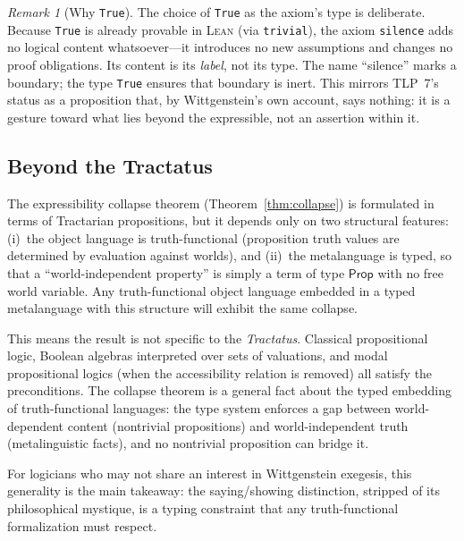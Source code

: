 \documentclass[jsl,bibother]{asl}
\theoremstyle{definition}
\theoremstyle{remark}
\newtheorem{remark}[theorem]{Remark}
\newcommand{\Prop}{\mathsf{Prop}}
\newcommand{\Lean}{\textsc{Lean}}
\begin{document}
\begin{remark}[Why \texttt{True}]
\label{rem:why-true}
The choice of \texttt{True} as the axiom's type is deliberate.
Because \texttt{True} is already provable in \Lean{} (via
\texttt{trivial}), the axiom \texttt{silence} adds no logical
content whatsoever---it introduces no new assumptions and
changes no proof obligations.  Its content is its \emph{label},
not its type.  The name ``silence'' marks a boundary; the
type \texttt{True} ensures that boundary is inert.  This
mirrors TLP~7's status as a proposition that, by Wittgenstein's
own account, says nothing: it is a gesture toward what lies
beyond the expressible, not an assertion within it.
\end{remark}

\subsection{Beyond the Tractatus}
\label{sec:beyond}

The expressibility collapse theorem
(Theorem~\ref{thm:collapse}) is formulated in terms of
Tractarian propositions, but it depends only on two structural
features: (i)~the object language is truth-functional
(proposition truth values are determined by evaluation against
worlds), and (ii)~the metalanguage is typed, so that a
``world-independent property'' is simply a term of type
$\Prop$ with no free world variable.  Any truth-functional
object language embedded in a typed metalanguage with this
structure will exhibit the same collapse.

This means the result is not specific to the
\emph{Tractatus}.  Classical propositional logic, Boolean
algebras interpreted over sets of valuations, and modal
propositional logics (when the accessibility relation is
removed) all satisfy the preconditions.  The collapse theorem
is a general fact about the typed embedding of truth-functional
languages: the type system enforces a gap between
world-dependent content (nontrivial propositions) and
world-independent truth (metalinguistic facts), and no
nontrivial proposition can bridge it.

For logicians who may not share an interest in Wittgenstein
exegesis, this generality is the main takeaway: the
saying/showing distinction, stripped of its philosophical
mystique, is a typing constraint that any truth-functional
formalization must respect.
\end{document}
